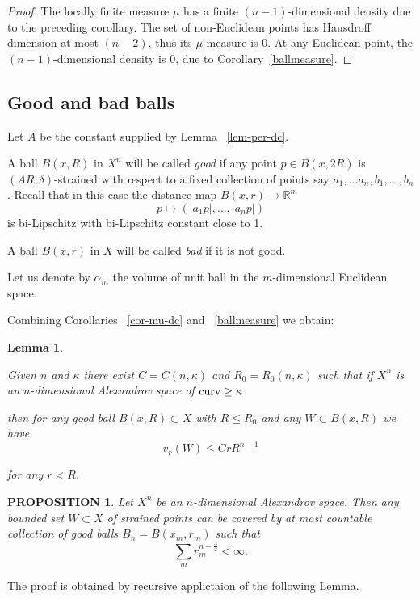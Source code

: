\documentclass[12pt,leqno]{amsart}
\numberwithin{equation}{section}
\newtheorem{lem}[thm]{Lemma}
\newtheorem{prop}[thm]{PROPOSITION}
\theoremstyle{definition}
\theoremstyle{remark}
\def\RR{\mathbb R}
\newcommand{\curv}{\mathop{\rm curv}}
\begin{document}
\begin{proof}
The locally finite measure $\mu$ has a finite $(n-1)$-dimensional density due to the preceding corollary.
The set of non-Euclidean points has Hausdroff dimension at most $(n-2)$, thus its $\mu$-measure is $0$.
At any Euclidean point, the $(n-1)$-dimensional density is $0$, due to Corollary~\ref{ballmeasure}.
\end{proof}


\subsection{Good and bad balls}
Let $A$ be the constant supplied by Lemma ~\ref{lem-per-dc}.

A ball $B(x,R)$ in $X^n$ will be called \emph{good}
if any point $p\in B(x,2 R)$ is  $(AR,\delta)$-strained with respect to a fixed
collection of points say $a_1,\dots a_n,b_1,\dots,b_n$.
Recall that in this case
the distance map $B(x,r)\to \RR^m$
$$p\mapsto(|a_1p|,\dots,|a_np|)$$
is bi-Lipschitz with bi-Lipschitz constant close to 1.

A ball $B(x,r)$ in $X$ will be called \emph{bad} if it is not good.

Let us denote by $\alpha_m$ the volume of unit ball in the $m$-dimensional Euclidean space.

Combining Corollaries ~\ref{cor-mu-dc} and ~\ref{ballmeasure} we obtain:
\begin{lem}\label{lem:good-ball}

Given $n$ and $\kappa$ there exist
 $C=C(n,\kappa)$ and $R_0=R_0(n,\kappa)$ such that if $X^n$ is an $n$-dimensional Alexandrov space of $\curv\ge\kappa$%

 then for any good ball $B(x,R)\subset X$ with $R\le R_0$ and any $W\subset B(x,R)$  we have
 \[
 v_r(W)\le Cr R^{n-1}
 \]


for any $r<R$.
\end{lem}



\begin{prop}\label{prop:covering}
Let $X^n$ be an $n$-dimensional Alexandrov space.
Then any bounded set $W\subset X$ of strained points can be covered by at most countable collection of good balls $B_n=B(x_m,r_m)$
such that
$$\sum_m r_m^{n-\frac32}<\infty.$$

\end{prop}

The proof is obtained by recursive applictaion of the following Lemma.
\end{document}
